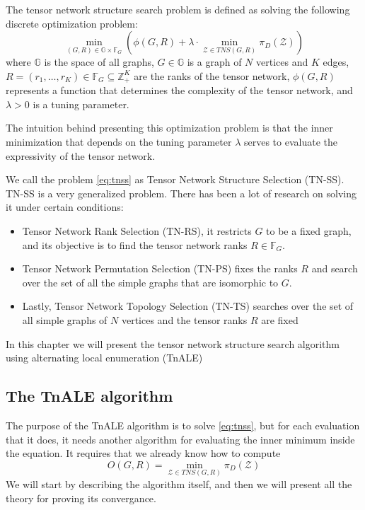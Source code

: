 \documentclass[11pt,a4paper,openright,oneside]{book}
\numberwithin{equation}{section}
\begin{document}
{The tensor network structure search problem is defined as solving the following discrete optimization problem:
\begin{equation}
\min_{(G, R) \in \mathbb{G} \times \mathbb{F}_G} \left(  \phi(G, R) + \lambda \cdot \min_{\mathcal{Z} \in TNS(G,R)} \pi_D(\mathcal{Z}) \right)
\label{eq:tnss}
\end{equation}
where $\mathbb{G}$ is the space of all graphs, $G \in \mathbb{G}$ is a graph of $N$ vertices and $K$ edges, ${R = (r_1, \dots, r_K) \in \mathbb{F}_G \subseteq
\mathbb{Z}_+^K}$ are the ranks of the tensor network, $\phi(G, R)$ represents a function that determines the complexity of the
tensor network, and $\lambda > 0$ is a tuning parameter.

The intuition behind presenting this optimization problem is that the inner minimization that depends on the tuning parameter $\lambda$
serves to evaluate the expressivity of the tensor network.


We call the problem \ref{eq:tnss} as Tensor Network Structure Selection (TN-SS). TN-SS is a very generalized problem.
There has been a lot of research on solving it under certain conditions:
\begin{itemize}
    \item Tensor Network Rank Selection (TN-RS), it restricts $G$ to be a fixed graph, and its objective is to find the
tensor network ranks $R \in \mathbb{F}_G$.
    \item Tensor Network Permutation Selection (TN-PS) fixes the ranks $R$ and search over the set
of all the simple graphs that are isomorphic to $G$.
    \item Lastly, Tensor Network Topology Selection (TN-TS) searches over the set of all simple graphs of $N$ vertices and
        the tensor ranks $R$ are fixed
\end{itemize}

In this chapter we will present the tensor network structure search algorithm using alternating local enumeration (TnALE) \cite{liAlternatingLocalEnumeration2023a}

\subsection{The TnALE algorithm}

The purpose of the TnALE algorithm is to solve \ref{eq:tnss}, but for each evaluation that it does, it needs another algorithm for evaluating
the inner minimum inside the equation. It requires that we already know how to compute 
\begin{equation}
    O(G, R) = \min_{\mathcal{Z} \in TNS(G,R)} \pi_D (\mathcal{Z})
    \label{eq:tnale-min-obj}
\end{equation}
We will start by describing the algorithm itself, and then we will present all the theory for proving its convergance.

}
\end{document}
